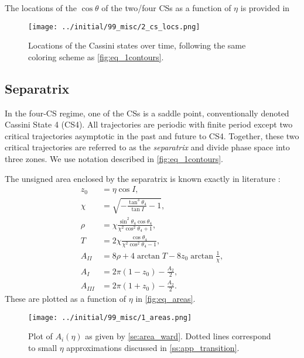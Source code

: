 \documentclass[
        fleqn,
        usenatbib,
    ]{mnras}
\newcommand*{\p}[1]{\left(#1\right)}
\begin{document}
The locations of the $\cos\theta$ of the two/four CSs as a function of $\eta$ is
provided in
\begin{figure}[t]
    \centering
    \texttt{[image: ../initial/99\_misc/2\_cs\_locs.png]}
    \caption{Locations of the Cassini states over time, following the same
    coloring scheme as \autoref{fig:eq_1contours}.}\label{fig:cs_locs}
\end{figure}

\subsection{Separatrix}

In the four-CS regime, one of the CSs is a saddle point, conventionally denoted
Cassini State 4 (CS4). All trajectories are periodic with finite period except
two critical trajectories asymptotic in the past and future to CS4. Together,
these two critical trajectories are referred to as the \emph{separatrix} and
divide phase space into three zones. We use notation described in
\autoref{fig:eq_1contours}.

The unsigned area enclosed by the separatrix is known exactly in literature
\citep{henrard1987,ward2004I}:
\begin{subequations}\label{se:area_ward}
    \begin{align}
        z_0 &= \eta\cos I,\nonumber\\
        \chi &= \sqrt{-\frac{\tan^3\theta_4}{\tan I} - 1},\nonumber\\
        \rho &= \chi \frac{\sin^2 \theta_4\cos \theta_4}{
            \chi^2 \cos^2\theta_4 + 1},\nonumber\\
        T &= 2\chi \frac{\cos \theta_4}{
            \chi^2 \cos^2\theta_4 - 1},\nonumber\\
        A_{II} &= 8\rho + 4\arctan T - 8z_0 \arctan \frac{1}{\chi},\\
        A_I &= 2\pi\p{1 - z_0} - \frac{A_2}{2},\\
        A_{III} &= 2\pi\p{1 + z_0} - \frac{A_2}{2}.
    \end{align}
\end{subequations}
These are plotted as a function of $\eta$ in \autoref{fig:eq_areas}.
\begin{figure}
    \centering
    \texttt{[image: ../initial/99\_misc/1\_areas.png]}
    \caption{Plot of $A_{i}(\eta)$ as given by \autoref{se:area_ward}. Dotted
    lines correspond to small $\eta$ approximations discussed in
    \autoref{ss:app_transition}.}\label{fig:eq_areas}
\end{figure}
\end{document}
